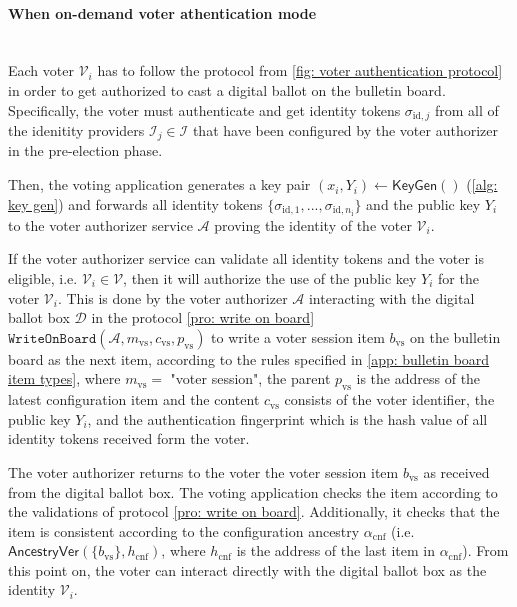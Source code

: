 \paragraph{When on-demand voter athentication mode}\mbox{}\\
Each voter $\mathcal{V}_i$ has to follow the protocol from \cref{fig: voter authentication protocol} in order to get authorized to cast a digital ballot on the bulletin board. Specifically, the voter must authenticate and get identity tokens $\sigma_{\mathrm{id}, j}$ from all of the idenitity providers $\mathcal{I}_j \in \boldsymbol{\mathcal{I}}$ that have been configured by the voter authorizer in the pre-election phase.

Then, the voting application generates a key pair $(x_i, Y_i) \gets \mathsf{KeyGen}()$ (\cref{alg: key gen}) and forwards all identity tokens $\{ \sigma_{\mathrm{id}, 1}, ..., \sigma_{\mathrm{id}, n_\mathrm{i}} \}$ and the public key $Y_i$ to the voter authorizer service $\mathcal{A}$ proving the identity of the voter $\mathcal{V}_i$.

If the voter authorizer service can validate all identity tokens and the voter is eligible, i.e. $\mathcal{V}_i \in \boldsymbol{\mathcal{V}}$, then it will authorize the use of the public key $Y_i$ for the voter $\mathcal{V}_i$. This is done by the voter authorizer $\mathcal{A}$ interacting with the digital ballot box $\mathcal{D}$ in the protocol \ref{pro: write on board} $\mathtt{WriteOnBoard}(\mathcal{A}, m_\mathrm{vs}, c_\mathrm{vs}, p_\mathrm{vs})$ to write a voter session item $b_\mathrm{vs}$ on the bulletin board as the next item, according to the rules specified in \cref{app: bulletin board item types}, where $m_\mathrm{vs} =$ "voter session", the parent $p_\mathrm{vs}$ is the address of the latest configuration item and the content $c_\mathrm{vs}$ consists of the voter identifier, the public key $Y_i$, and the authentication fingerprint which is the hash value of all identity tokens received form the voter. 

The voter authorizer returns to the voter the voter session item $b_\mathrm{vs}$ as received from the digital ballot box. The voting application checks the item according to the validations of protocol \ref{pro: write on board}. Additionally, it checks that the item is consistent according to the configuration ancestry $\alpha_\mathrm{cnf}$ (i.e. $\mathsf{AncestryVer}(\{ b_\mathrm{vs} \}, h_\mathrm{cnf})$, where $h_\mathrm{cnf}$ is the address of the last item in $\alpha_\mathrm{cnf}$). From this point on, the voter can interact directly with the digital ballot box as the identity $\mathcal{V}_i$.

